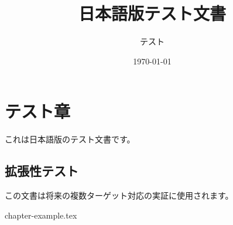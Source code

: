 \documentclass[12pt,a4paper]{ltjsbook}
\title{日本語版テスト文書}
\author{テスト}
\date{\today}
\begin{document}
\maketitle

\chapter{テスト章}

これは日本語版のテスト文書です。

\section{拡張性テスト}

この文書は将来の複数ターゲット対応の実証に使用されます。

{chapter-example.tex}



\end{document}
